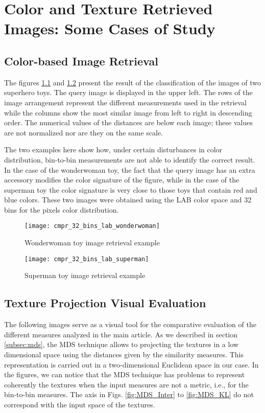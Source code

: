 
\chapter{Color and Texture Retrieved Images: Some Cases of Study}

\section{Color-based Image Retrieval}\label{sec:sm_color:class}
The figures \ref{fig:wonderwoman_distances} and \ref{fig:superman_distances} present the result of the classification of the images of two superhero toys. The query image is displayed in the upper left. The rows of the image arrangement represent the different measurements used in the retrieval while the columns show the most similar image from left to right in descending order. The numerical values of the distances are below each image; these values are not normalized nor are they on the same scale.

The two examples here show how, under certain disturbances in color distribution, bin-to-bin measurements are not able to identify the correct result. In the case of the wonderwoman toy, the fact that the query image has an extra accessory modifies the color signature of the figure, while in the case of the superman toy the color signature is very close to those toys that contain red and blue colors. These two images were obtained using the LAB color space and 32 bins for the pixels color distribution.
\begin{figure}[!ht]
 \centering    
 \texttt{[image: cmpr\_32\_bins\_lab\_wonderwoman]}
 \caption{Wonderwoman toy image retrieval example}
 \label{fig:wonderwoman_distances}
\end{figure}

\begin{figure}[!ht]
 \centering    
 \texttt{[image: cmpr\_32\_bins\_lab\_superman]}
 \caption{Superman toy image retrieval example}
 \label{fig:superman_distances}
\end{figure}

\pagebreak
\section{Texture Projection Visual Evaluation}\label{sec:sm_mds}

The following images serve as a visual tool for the comparative evaluation of the different measures analyzed in the main article. As we described in section \ref{subsec:mds}, the MDS technique allows to projecting the textures in a low dimensional space using the distances given by the similarity measures. This representation is carried out in a two-dimensional Euclidean space in our case. In the figures, we can notice that the MDS technique has problems to represent coherently the textures when the input measures are not a metric, i.e., for the bin-to-bin measures. The axis in  Figs. \ref{fig:MDS_Inter} to \ref{fig:MDS_KL} do not correspond with the input space of the textures. 

